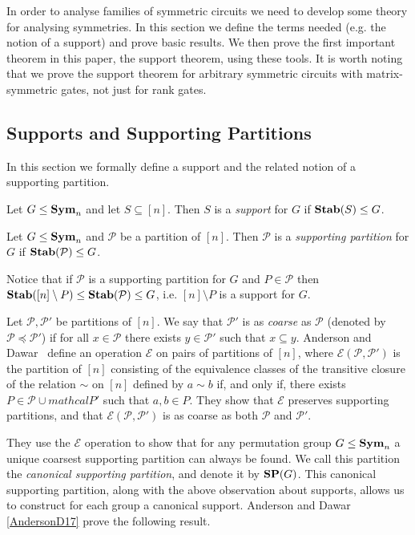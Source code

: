 \documentclass[../paper.tex]{subfiles}
\begin{document}
In order to analyse families of symmetric circuits we need to develop some
theory for analysing symmetries. In this section we define the terms needed
(e.g. the notion of a support) and prove basic results. We then prove the first
important theorem in this paper, the support theorem, using these tools. It is
worth noting that we prove the support theorem for arbitrary symmetric circuits
with matrix-symmetric gates, not just for rank gates.

\subsection{Supports and Supporting Partitions}
In this section we formally define a support and the related notion of a
supporting partition.

\begin{definition}
  Let $G \leq \text{\textbf{Sym}}_n$ and let $S \subseteq [n]$. Then $S$ is a \emph{support}
  for $G$ if $\text{\textbf{Stab}}(S) \leq G$.
\end{definition}

\begin{definition}
  Let $G \leq \text{\textbf{Sym}}_n$ and $\mathcal{P}$ be a partition of $[n]$. Then
  $\mathcal{P}$ is a \emph{supporting partition} for $G$ if $\text{\textbf{Stab}}(\mathcal{P})
  \leq G$.
\end{definition}

Notice that if $\mathcal{P}$ is a supporting partition for $G$ and $P \in
\mathcal{P}$ then $\text{\textbf{Stab}}([n] \setminus P) \leq \text{\textbf{Stab}}(\mathcal{P}) \leq G$, i.e.
$[n] \setminus P$ is a support for $G$.

Let $\mathcal{P}, \mathcal{P}'$ be partitions of $[n]$. We say that
$\mathcal{P}'$ is as \emph{coarse} as $\mathcal{P}$ (denoted by $\mathcal{P}
\preceq \mathcal{P}'$) if for all $x \in \mathcal{P}$ there exists $y \in
\mathcal{P}'$ such that $x \subseteq y$. Anderson and Dawar~\cite{AndersonD17}
define an operation $\mathcal{E}$ on pairs of partitions of $[n]$, where
$\mathcal{E} (\mathcal{P}, \mathcal{P}')$ is the partition of $[n]$ consisting
of the equivalence classes of the transitive closure of the relation $\sim$ on
$[n]$ defined by $a \sim b$ if, and only if, there exists $P \in \mathcal{P}
\cup mathcal{P}'$ such that $a,b \in P$. They show that $\mathcal{E}$ preserves
supporting partitions, and that $\mathcal{E}(\mathcal{P}, \mathcal{P}')$ is as
coarse as both $\mathcal{P}$ and $\mathcal{P}'$.

They use the $\mathcal{E}$ operation to show that for any permutation group $G
\leq \text{\textbf{Sym}}_n$ a unique coarsest supporting partition can always be found. We call
this partition the \emph{canonical supporting partition}, and denote it by $\text{\textbf{SP}}
(G)$. This canonical supporting partition, along with the above observation
about supports, allows us to construct for each group a canonical support.
Anderson and Dawar \ref{AndersonD17} prove the following result.
\end{document}
